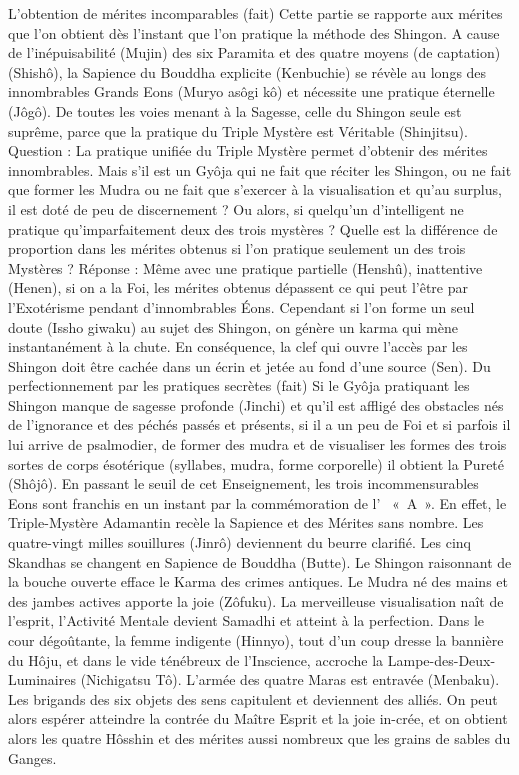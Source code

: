 L'obtention de mérites incomparables (fait)
Cette partie se rapporte aux mérites que l’on obtient dès l'instant que l’on pratique la méthode des Shingon.
A cause de l’inépuisabilité (Mujin) des six Paramita et des quatre moyens (de captation) (Shishô), la Sapience du Bouddha explicite (Kenbuchie) se révèle au longs des innombrables Grands Eons (Muryo asôgi kô) et nécessite une pratique éternelle (Jôgô). De toutes les voies menant à la Sagesse, celle du Shingon seule est suprême, parce que la pratique du Triple Mystère est Véritable (Shinjitsu).
Question : 
La pratique unifiée du Triple Mystère permet d’obtenir des mérites innombrables. Mais s'il est un Gyôja qui ne fait que réciter les Shingon, ou ne fait que former les Mudra ou ne fait que s’exercer à la visualisation et qu’au surplus, il est doté de peu de discernement ? Ou alors, si quelqu’un d’intelligent ne pratique qu’imparfaitement deux des trois mystères ? Quelle est la différence de proportion dans les mérites obtenus si l’on pratique seulement un des trois Mystères ?
Réponse : 
Même avec une pratique partielle (Henshû), inattentive (Henen), si on a la Foi, les mérites obtenus dépassent ce qui peut l’être par l'Exotérisme pendant d'innombrables Éons. Cependant si l'on forme un seul doute (Issho giwaku) au sujet des Shingon, on génère un karma qui mène instantanément à la chute.
En conséquence, la clef qui ouvre l’accès par les Shingon doit être cachée dans un écrin et jetée au fond d’une source (Sen).
Du perfectionnement par les pratiques secrètes (fait)
Si le Gyôja pratiquant les Shingon manque de sagesse profonde (Jinchi) et qu'il est affligé des obstacles nés de l'ignorance et des péchés passés et présents, si il a un peu de Foi et si parfois il lui arrive de psalmodier, de former des mudra et de visualiser les formes des trois sortes de corps ésotérique (syllabes, mudra, forme corporelle) il obtient la Pureté (Shôjô).
En passant le seuil de cet Enseignement, les trois incommensurables Eons sont franchis en un instant par la commémoration de l’  « A ». En effet, le Triple-Mystère Adamantin recèle la Sapience et des Mérites sans nombre. Les quatre-vingt milles souillures (Jinrô) deviennent du beurre clarifié. Les cinq Skandhas se changent en Sapience de Bouddha (Butte). Le Shingon raisonnant de la bouche ouverte efface le Karma des crimes antiques. Le Mudra né des mains et des jambes actives apporte la joie (Zôfuku). La merveilleuse visualisation naît de l’esprit, l'Activité Mentale devient Samadhi et atteint à la perfection.
Dans le cour dégoûtante, la femme indigente (Hinnyo), tout d'un coup dresse la bannière du Hôju, et dans le vide ténébreux de l’Inscience, accroche la Lampe-des-Deux-Luminaires (Nichigatsu Tô). L’armée des quatre Maras est entravée (Menbaku). Les brigands des six objets des sens capitulent et deviennent des alliés. On peut alors espérer atteindre la contrée du Maître Esprit et la joie in-crée, et on obtient alors les quatre Hôsshin et des mérites aussi nombreux que les grains de sables du Ganges.
